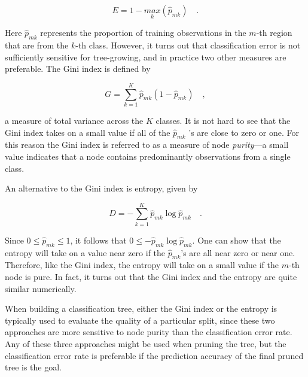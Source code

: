 \documentclass[a4paper, 12pt]{book}
\begin{document}
\begin{center}
\begin{equation}
 E = 1 - \underset{k}{max}(\widehat{p}_{mk}) \quad.
\end{equation}
\end{center}


Here $\widehat{p}_{mk}$ represents the proportion of training observations in the $m$-th region that are from the $k$-th class. 
However, it turns out that classification error is not sufficiently sensitive for tree-growing,
and in practice two other measures are preferable.
The Gini index is defined by

\begin{center}
\begin{equation}
G = \sum_{k=1}^{K} \widehat{p}_{mk}(1 -  \widehat{p}_{mk}) \quad ,
\end{equation}
\end{center}

a measure of total variance across the $K$ classes. It is not hard to see that the Gini index takes on
a small value if all of the $\widehat{p}_{mk}$ ’s are close to zero or one.  For this reason the Gini index
is referred to as a measure of node \emph{purity}—a small value indicates that a node contains predominantly
observations from a single class.

An alternative to the Gini index is entropy, given by

\begin{center}
\begin{equation}
D = - \sum_{k=1}^{K} \widehat{p}_{mk}\log \widehat{p}_{mk}   \quad .
\end{equation}
\end{center}

Since $0 \leq  \widehat{p}_{mk} \leq 1$, it follows that $0 \leq - \widehat{p}_{mk} \log  \widehat{p}_{mk}$.
One can show that the entropy will take on a value near zero if the $\widehat{p}_{mk}$’s are all near zero or
near one. Therefore, like the Gini index, the entropy will take on a small value if the $m$-th node is pure.
In fact, it turns out that the Gini index and the entropy are quite similar numerically.

When building a classification tree, either the Gini index or the entropy is typically used to evaluate
the quality of a particular split, since these two approaches are more sensitive to node purity than 
the classification error rate. Any of these three approaches might be used when pruning the
tree, but the classification error rate is preferable if the prediction accuracy of the final pruned tree is the goal.
\end{document}
